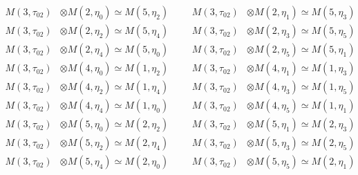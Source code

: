 \begin{align*}
M(3,\tau_{02}) &\otimes M(2,\eta_{0}) \simeq M(5,\eta_{2}) &&& M(3,\tau_{02}) &\otimes M(2,\eta_{1}) \simeq M(5,\eta_{3})\\
M(3,\tau_{02}) &\otimes M(2,\eta_{2}) \simeq M(5,\eta_{4}) &&& M(3,\tau_{02}) &\otimes M(2,\eta_{3}) \simeq M(5,\eta_{5})\\
M(3,\tau_{02}) &\otimes M(2,\eta_{4}) \simeq M(5,\eta_{0}) &&& M(3,\tau_{02}) &\otimes M(2,\eta_{5}) \simeq M(5,\eta_{1})\\
M(3,\tau_{02}) &\otimes M(4,\eta_{0}) \simeq M(1,\eta_{2}) &&& M(3,\tau_{02}) &\otimes M(4,\eta_{1}) \simeq M(1,\eta_{3})\\
M(3,\tau_{02}) &\otimes M(4,\eta_{2}) \simeq M(1,\eta_{4}) &&& M(3,\tau_{02}) &\otimes M(4,\eta_{3}) \simeq M(1,\eta_{5})\\
M(3,\tau_{02}) &\otimes M(4,\eta_{4}) \simeq M(1,\eta_{0}) &&& M(3,\tau_{02}) &\otimes M(4,\eta_{5}) \simeq M(1,\eta_{1})\\
M(3,\tau_{02}) &\otimes M(5,\eta_{0}) \simeq M(2,\eta_{2}) &&& M(3,\tau_{02}) &\otimes M(5,\eta_{1}) \simeq M(2,\eta_{3})\\
M(3,\tau_{02}) &\otimes M(5,\eta_{2}) \simeq M(2,\eta_{4}) &&& M(3,\tau_{02}) &\otimes M(5,\eta_{3}) \simeq M(2,\eta_{5})\\
M(3,\tau_{02}) &\otimes M(5,\eta_{4}) \simeq M(2,\eta_{0}) &&& M(3,\tau_{02}) &\otimes M(5,\eta_{5}) \simeq M(2,\eta_{1})\\
\end{align*}

